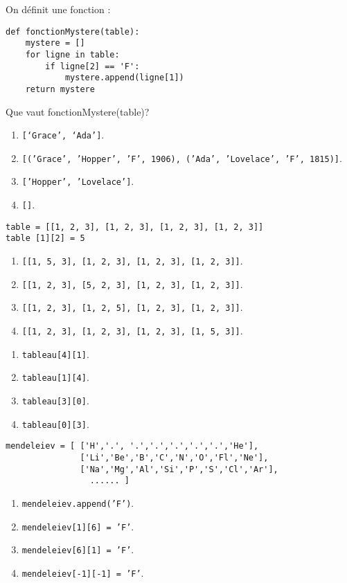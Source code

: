 On définit une fonction :
\begin{lstlisting}
def fonctionMystere(table):
    mystere = []
    for ligne in table:
        if ligne[2] == 'F':
            mystere.append(ligne[1])
    return mystere
\end{lstlisting}
Que vaut fonctionMystere(table)?
\begin{enumerate}
\item \texttt{[‘Grace’, ‘Ada’]}.
\item \texttt{[('Grace', 'Hopper', 'F', 1906), ('Ada', 'Lovelace', 'F', 1815)]}.
\item \texttt{['Hopper', 'Lovelace']}. %
\item \texttt{[]}.
\end{enumerate}

\begin{lstlisting}
table = [[1, 2, 3], [1, 2, 3], [1, 2, 3], [1, 2, 3]]
table [1][2] = 5
\end{lstlisting}
\begin{enumerate}
\item \texttt{[[1, 5, 3], [1, 2, 3], [1, 2, 3], [1, 2, 3]]}.
\item \texttt{[[1, 2, 3], [5, 2, 3], [1, 2, 3], [1, 2, 3]]}.
\item \texttt{[[1, 2, 3], [1, 2, 5], [1, 2, 3], [1, 2, 3]]}. %
\item \texttt{[[1, 2, 3], [1, 2, 3], [1, 2, 3], [1, 5, 3]]}.
\end{enumerate}

\begin{enumerate}
\item \texttt{tableau[4][1]}.
\item \texttt{tableau[1][4]}.
\item \texttt{tableau[3][0]}. %
\item \texttt{tableau[0][3]}.
\end{enumerate}

\begin{lstlisting}
mendeleiev = [ ['H','.', '.','.','.','.','.','He'],
               ['Li','Be','B','C','N','O','Fl','Ne'],
               ['Na','Mg','Al','Si','P','S','Cl','Ar'],
                 ...... ]
\end{lstlisting}
\begin{enumerate}
\item \texttt{mendeleiev.append('F')}.
\item \texttt{mendeleiev[1][6] = 'F'}. %
\item \texttt{mendeleiev[6][1] = 'F'}.
\item \texttt{mendeleiev[-1][-1] = 'F'}.
\end{enumerate}

